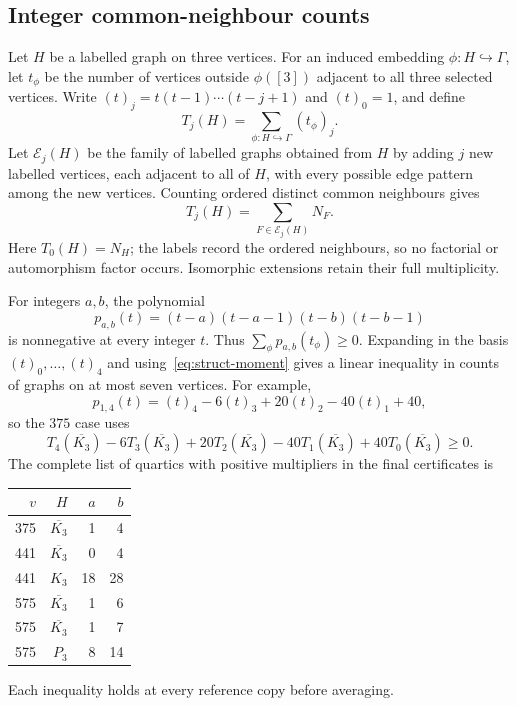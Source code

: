 \documentclass[11pt]{article}
\theoremstyle{remark}
\numberwithin{equation}{section}
\begin{document}
\subsection{Integer common-neighbour counts}
\label{subsec:integer-triples}
Let $H$ be a labelled graph on three vertices.  For an induced embedding
$\phi:H\hookrightarrow\Gamma$, let $t_\phi$ be the number of vertices
outside $\phi([3])$ adjacent to all three selected vertices.  Write
$(t)_j=t(t-1)\cdots(t-j+1)$ and $(t)_0=1$, and define
\[
 T_j(H)=\sum_{\phi:H\hookrightarrow\Gamma}(t_\phi)_j.
\]
Let $\mathcal E_j(H)$ be the family of labelled graphs obtained from $H$
by adding $j$ new labelled vertices, each adjacent to all of $H$, with
every possible edge pattern among the new vertices.  Counting ordered
distinct common neighbours gives
\begin{equation}\label{eq:struct-moment}
 T_j(H)=\sum_{F\in\mathcal E_j(H)}N_F.
\end{equation}
Here $T_0(H)=N_H$; the labels record the ordered neighbours, so no
factorial or automorphism factor occurs. Isomorphic extensions retain
their full multiplicity.

For integers $a,b$, the polynomial
\begin{equation}\label{eq:struct-quartic}
 p_{a,b}(t)=(t-a)(t-a-1)(t-b)(t-b-1)
\end{equation}
is nonnegative at every integer $t$.  Thus
$\sum_\phi p_{a,b}(t_\phi)\ge0$.  Expanding in the basis
$(t)_0,\ldots,(t)_4$ and using~\eqref{eq:struct-moment} gives a
linear inequality in counts of graphs on at most seven vertices.
For example,
\[
 p_{1,4}(t)=(t)_4-6(t)_3+20(t)_2-40(t)_1+40,
\]
so the $375$ case uses
\[
 T_4(\overline{K_3})-6T_3(\overline{K_3})
 +20T_2(\overline{K_3})-40T_1(\overline{K_3})
 +40T_0(\overline{K_3})\ge0.
\]
The complete list of quartics with positive multipliers in the final
certificates is
\begin{center}
\begin{tabular}{rrrr}
\toprule
$v$&$H$&$a$&$b$\\
\midrule
375&$\overline{K_3}$&1&4\\
441&$\overline{K_3}$&0&4\\
441&$K_3$&18&28\\
575&$\overline{K_3}$&1&6\\
575&$\overline{K_3}$&1&7\\
575&$P_3$&8&14\\
\bottomrule
\end{tabular}
\end{center}
Each inequality holds at every reference copy before averaging.
\end{document}
